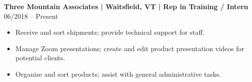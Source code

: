 \noindent
\textbf{Three Mountain Associates | Waitsfield, VT | Rep in Training / Intern} \hfill 06/2018 -- Present
\begin{itemize}
    \item Receive and sort shipments; provide technical support for staff.
    \item Manage Zoom presentations; create and edit product presentation videos for potential clients.
    \item Organize and sort products; assist with general administrative tasks.
\end{itemize}

